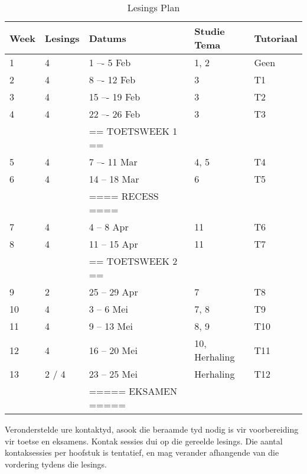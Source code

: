         \begin{table}[!h]
            \begin{center}
             \begin{tabular}{|l|l|l|l|l|}
                 \hline
                 {\bf Week} & {\bf Lesings} & {\bf Datums} & {\bf Studie Tema}
                 & {\bf Tutoriaal} \\
                 \hline
                 1  & 4     &  1 –-  5 Feb      & 1, 2  & Geen \\
                 2  & 4     &  8 –- 12 Feb      & 3     & T1 \\
                 3  & 4     & 15 –- 19 Feb      & 3     & T2 \\
                 4  & 4     & 22 –- 26 Feb      & 3     & T3 \\
                    &       & == TOETSWEEK 1 == &       & \\
                 5  & 4     &  7 –- 11 Mar      & 4, 5  & T4 \\
                 6  & 4     & 14 -- 18 Mar      & 6     & T5 \\
                    &       & ==== RECESS ====  &       & \\
                 7  & 4     &  4 --  8 Apr      & 11    & T6 \\
                 8  & 4     & 11 -- 15 Apr      & 11    & T7 \\
                    &       & == TOETSWEEK 2 == &       & \\
                 9  & 2     & 25 -- 29 Apr      & 7     & T8 \\
                 10 & 4     &  3 --  6 Mei      & 7, 8  & T9 \\
                 11 & 4     &  9 -- 13 Mei      & 8, 9  & T10 \\
                 12 & 4     & 16 -- 20 Mei      & 10, Herhaling & T11 \\
                 13 & 2 / 4 & 23 -- 25 Mei      & Herhaling & T12 \\
                    &       & ===== EKSAMEN ===== &       & \\
                 \hline
             \end{tabular}
             \caption{Lesings Plan} \label{tab:lec_plan}
            \end{center}
        \end{table}


	Veronderstelde ure kontaktyd, asook die beraamde tyd 
         nodig is vir voorbereiding vir toetse en eksamens. Kontak sessies dui 
         op die gereelde lesings. Die aantal kontaksessies per hoofstuk is 
         tentatief, en mag verander afhangende van die vordering tydens die lesings.

